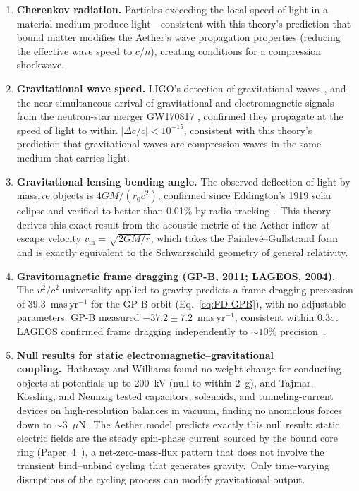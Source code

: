 ﻿\documentclass[12pt,letterpaper]{article}
\newcommand{\vin}{v_{\mathrm{in}}}
\begin{document}
\begin{enumerate}[leftmargin=2em]
  \item \textbf{Cherenkov radiation.} Particles exceeding the local speed of light in a material
    medium produce light---consistent with this theory's prediction that bound matter
    modifies the Aether's wave propagation properties (reducing the effective wave speed
    to $c/n$), creating conditions for a compression shockwave.

  \item \textbf{Gravitational wave speed.} LIGO's detection of gravitational waves \cite{ligo2016}, and
    the near-simultaneous arrival of gravitational and electromagnetic signals from the
    neutron-star merger GW170817 \cite{gw170817}, confirmed they
    propagate at the speed of light to within $|{\Delta c}/{c}| < 10^{-15}$, consistent
    with this theory's prediction that gravitational waves are compression waves in the
    same medium that carries light.

  \item \textbf{Gravitational lensing bending angle.} The observed deflection of light by massive
    objects is $4GM/(r_0 c^2)$, confirmed since Eddington's 1919 solar eclipse \cite{eddington1920} and verified
    to better than 0.01\% by radio tracking \cite{bertotti2003}.\ This theory derives this exact result from
    the acoustic metric of the Aether inflow at escape velocity $\vin = \sqrt{2GM/r}$,
    which takes the Painlev\'e--Gullstrand form and is exactly equivalent to the
    Schwarzschild geometry of general relativity.

  \item \textbf{Gravitomagnetic frame dragging (GP-B, 2011; LAGEOS, 2004).}
    The $v^2/c^2$ universality applied to gravity predicts a frame-dragging
    precession of $39.3$~mas\,yr$^{-1}$ for the GP-B orbit
    (Eq.~\ref{eq:FD-GPB}), with no adjustable parameters.
    GP-B measured $-37.2 \pm 7.2$~mas\,yr$^{-1}$, consistent within
    $0.3\sigma$.  LAGEOS confirmed frame dragging independently
    to $\sim\!10\%$ precision~\cite{everitt2011,Ciufolini2004}.

  \item \textbf{Null results for static electromagnetic--gravitational coupling.}\
    Hathaway and Williams \cite{hathaway2021} found no weight change for
    conducting objects at potentials up to 200~kV (null to within 2~g), and
    Tajmar, K\"ossling, and Neunzig \cite{tajmar2024} tested capacitors,
    solenoids, and tunneling-current devices on high-resolution balances in
    vacuum, finding no anomalous forces down to $\sim$3~$\mu$N.\ The Aether
    model predicts exactly this null result: static electric fields are the
    steady spin-phase current sourced by the bound core ring
    (Paper~4~\cite{otto-em}), a net-zero-mass-flux pattern that does not
    involve the transient bind--unbind cycling that generates gravity.\
    Only time-varying disruptions of the cycling process can modify
    gravitational output.


\end{enumerate}
\end{document}
